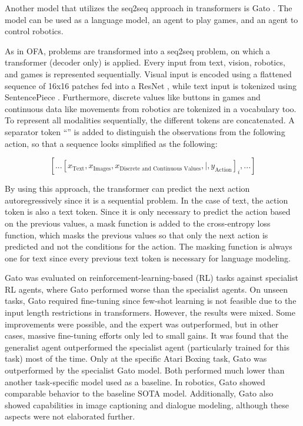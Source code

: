 \documentclass[
]{krantz}
\begin{document}
Another model that utilizes the seq2seq approach in transformers is Gato \citep{Reed2022}. The model can be used as a language model, an agent to play games, and an agent to control robotics.

As in OFA, problems are transformed into a seq2seq problem, on which a transformer (decoder only) is applied. Every input from text, vision, robotics, and games is represented sequentially.
Visual input is encoded using a flattened sequence of 16x16 patches fed into a ResNet \citep{ResNet}, while text input is tokenized using SentencePiece \citep{kudo-richardson-2018-sentencepiece}.
Furthermore, discrete values like buttons in games and continuous data like movements from robotics are tokenized in a vocabulary too. To represent
all modalities sequentially, the different tokens are concatenated. A separator token ``\textbar{}'' is added to distinguish the observations from the following action, so that a sequence looks simplified as the following:

\[\left [ ... \left [ x_{\textrm{Text}}, x_{\textrm{Images}}, x_{\textrm{Discrete and Continuous Values}}, |, y_{\textrm{Action}} \right ]_i, ... \right ]\]

By using this approach, the transformer can predict the next action autoregressively since it is a sequential problem. In the case of text, the action token is also a text token. Since it is
only necessary to predict the action based on the previous values, a mask function is added to the cross-entropy loss function, which masks the previous values so that only the next action
is predicted and not the conditions for the action. The masking function is always one for text since every previous text token is necessary for language modeling.

Gato was evaluated on reinforcement-learning-based (RL) tasks against specialist RL agents, where Gato performed worse than the specialist agents. On unseen tasks, Gato required fine-tuning since
few-shot learning is not feasible due to the input length restrictions in transformers. However, the results were mixed. Some improvements were possible, and the expert was outperformed, but
in other cases, massive fine-tuning efforts only led to small gains. It was found that the generalist agent outperformed the specialist agent (particularly trained for this task) most of the time.
Only at the specific Atari Boxing \citep{atari} task, Gato was outperformed by the specialist Gato model. Both performed much lower than another task-specific model used as a baseline. In robotics, Gato showed comparable
behavior to the baseline SOTA model. Additionally, Gato also showed capabilities in image captioning and dialogue modeling, although these aspects were not elaborated further.
\end{document}
